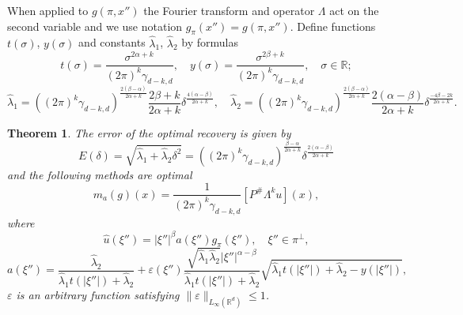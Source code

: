 \documentclass[12pt]{iopart}
\newtheorem{theorem}{Theorem}
\begin{document}
When applied to $g(\pi,x'')$ the Fourier transform and operator $\Lambda$ act on the second variable and we use notation $g_\pi(x'')=g(\pi,x'')$. Define functions $t(\sigma)$, $y(\sigma)$ and constants $\widehat\lambda_1$, $\widehat\lambda_2$ by formulas
  \begin{equation}
  \label{xy}
  t(\sigma)=\frac{\sigma^{2\alpha+k}}{(2\pi)^{k}\gamma_{d-k,d}},\quad
  y(\sigma)=\frac{\sigma^{2\beta+k}}{(2\pi)^{k}\gamma_{d-k,d}},\quad \sigma\in\mathbb R;
  \end{equation}
  \begin{equation}
    \label{lambda}
    \widehat\lambda_1=((2\pi)^k\gamma_{d-k,d})^{\frac{2(\beta-\alpha)}{2\alpha+k}}\frac{2\beta+k}{2\alpha+k}\delta^\frac{4(\alpha-\beta)}{2\alpha+k},\quad \widehat\lambda_2=((2\pi)^k\gamma_{d-k,d})^{\frac{2(\beta-\alpha)}{2\alpha+k}}\frac{2(\alpha-\beta)}{2\alpha+k}\delta^\frac{-4\beta-2k}{2\alpha+k}. 
  \end{equation}

\begin{theorem}
\label{theorem}
The error of the optimal recovery is given by
  \[
E(\delta)=\sqrt{\widehat\lambda_1+\widehat\lambda_2\delta^2}=((2\pi)^k\gamma_{d-k,d})^{\frac{\beta-\alpha}{2\alpha+k}}\delta^{\frac{2(\alpha-\beta)}{2\alpha+k}}
\]
and the following methods are optimal
	\begin{equation}
	\label{method}
	m_a(g)(x) = \frac{1}{(2\pi)^k\gamma_{d-k,d}}[P^\#\Lambda^ku](x),
	\end{equation}
where	
	$$\widehat{u}(\xi'')=|\xi''|^\beta a(\xi'')\widehat{g_\pi }(\xi''),\quad \xi''\in\pi^\perp,$$
    \begin{equation}
    \label{a}
    a(\xi'')=\frac{\widehat\lambda_2}{\widehat\lambda_1t(|\xi''|)+\widehat\lambda_2}+\varepsilon(\xi'')\frac{\sqrt{\widehat\lambda_1\widehat\lambda_2}|\xi''|^{\alpha-\beta}}{\widehat\lambda_1t(|\xi''|)+\widehat\lambda_2}\sqrt{\widehat\lambda_1t(|\xi''|)+\widehat\lambda_2-y(|\xi''|)},
    \end{equation}
$\varepsilon$ is an arbitrary function satisfying $\|\varepsilon\|_{L_\infty(\mathbb R^d)}\leqslant 1$.
\end{theorem}
\end{document}

